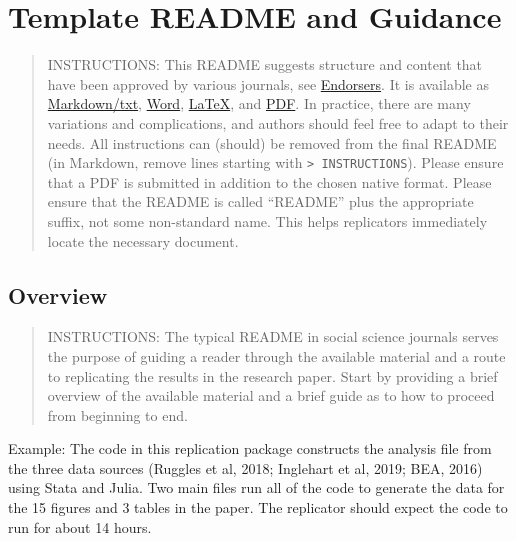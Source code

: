 \documentclass[
]{article}
\author{}
\date{}
\begin{document}
\hypertarget{template-readme-and-guidance}{%
\section{Template README and
Guidance}\label{template-readme-and-guidance}}

\begin{quote}
INSTRUCTIONS: This README suggests structure and content that have been
approved by various journals, see
\href{https://social-science-data-editors.github.io/template_README/Endorsers.html}{Endorsers}.
It is available as
\href{https://github.com/social-science-data-editors/template_README/blob/master/template-README.html}{Markdown/txt},
\href{https://social-science-data-editors.github.io/template_README/templates/README.docx}{Word},
\href{https://social-science-data-editors.github.io/template_README/templates/README.tex}{LaTeX},
and
\href{https://social-science-data-editors.github.io/template_README/templates/README.pdf}{PDF}.
In practice, there are many variations and complications, and authors
should feel free to adapt to their needs. All instructions can (should)
be removed from the final README (in Markdown, remove lines starting
with \texttt{\textgreater{}\ INSTRUCTIONS}). Please ensure that a PDF is
submitted in addition to the chosen native format. Please ensure that
the README is called ``README'' plus the appropriate suffix, not some
non-standard name. This helps replicators immediately locate the
necessary document.
\end{quote}

\hypertarget{overview}{%
\subsection{Overview}\label{overview}}

\begin{quote}
INSTRUCTIONS: The typical README in social science journals serves the
purpose of guiding a reader through the available material and a route
to replicating the results in the research paper. Start by providing a
brief overview of the available material and a brief guide as to how to
proceed from beginning to end.
\end{quote}

Example: The code in this replication package constructs the analysis
file from the three data sources (Ruggles et al, 2018; Inglehart et al,
2019; BEA, 2016) using Stata and Julia. Two main files run all of the
code to generate the data for the 15 figures and 3 tables in the paper.
The replicator should expect the code to run for about 14 hours.
\end{document}
